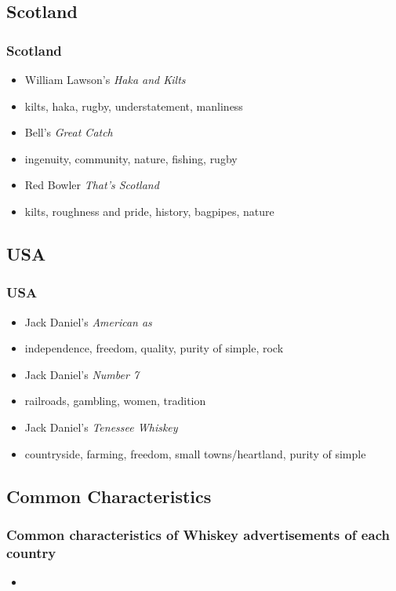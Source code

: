 \documentclass{beamer}
\begin{document}
\subsection{Scotland}

\begin{frame}
 \frametitle{Scotland}
 \begin{itemize}
  \item<1-> William Lawson's \emph{Haka and Kilts}
  \item<2-> kilts, haka, rugby, understatement, manliness
  \item<3-> Bell's \emph{Great Catch}
  \item<4-> ingenuity, community, nature, fishing, rugby
  \item<5-> Red Bowler \emph{That's Scotland}
  \item<6> kilts, roughness and pride, history, bagpipes, nature
 \end{itemize}
\end{frame}

\subsection{USA}

\begin{frame}
 \frametitle{USA}
 \begin{itemize}
  \item<1-> Jack Daniel's \emph{American as}
  \item<2-> independence, freedom, quality, purity of simple, rock
  \item<3-> Jack Daniel's \emph{Number 7}
  \item<4-> railroads, gambling, women, tradition
  \item<5-> Jack Daniel's \emph{Tenessee Whiskey}
  \item<6-> countryside, farming, freedom, small towns/heartland, purity of simple
 \end{itemize}
\end{frame}

\subsection{Common Characteristics}

\begin{frame}
 \frametitle{Common characteristics of Whiskey advertisements of each country}
 \begin{itemize}
  \item
 \end{itemize}
\end{frame}
\end{document}
